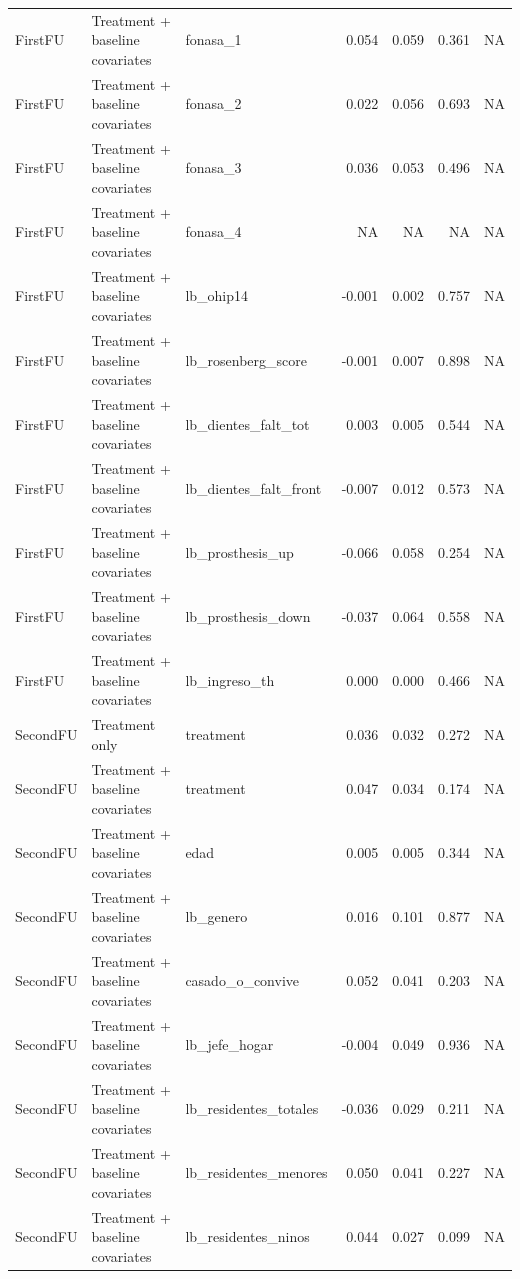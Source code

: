 \begin{table}
\begin{tabular}[t]{lllrrrr}
FirstFU & Treatment + baseline covariates & fonasa\_1 & 0.054 & 0.059 & 0.361 & NA\\
FirstFU & Treatment + baseline covariates & fonasa\_2 & 0.022 & 0.056 & 0.693 & NA\\
\addlinespace
FirstFU & Treatment + baseline covariates & fonasa\_3 & 0.036 & 0.053 & 0.496 & NA\\
FirstFU & Treatment + baseline covariates & fonasa\_4 & NA & NA & NA & NA\\
FirstFU & Treatment + baseline covariates & lb\_ohip14 & -0.001 & 0.002 & 0.757 & NA\\
FirstFU & Treatment + baseline covariates & lb\_rosenberg\_score & -0.001 & 0.007 & 0.898 & NA\\
FirstFU & Treatment + baseline covariates & lb\_dientes\_falt\_tot & 0.003 & 0.005 & 0.544 & NA\\
\addlinespace
FirstFU & Treatment + baseline covariates & lb\_dientes\_falt\_front & -0.007 & 0.012 & 0.573 & NA\\
FirstFU & Treatment + baseline covariates & lb\_prosthesis\_up & -0.066 & 0.058 & 0.254 & NA\\
FirstFU & Treatment + baseline covariates & lb\_prosthesis\_down & -0.037 & 0.064 & 0.558 & NA\\
FirstFU & Treatment + baseline covariates & lb\_ingreso\_th & 0.000 & 0.000 & 0.466 & NA\\
SecondFU & Treatment only & treatment & 0.036 & 0.032 & 0.272 & NA\\
\addlinespace
SecondFU & Treatment + baseline covariates & treatment & 0.047 & 0.034 & 0.174 & NA\\
SecondFU & Treatment + baseline covariates & edad & 0.005 & 0.005 & 0.344 & NA\\
SecondFU & Treatment + baseline covariates & lb\_genero & 0.016 & 0.101 & 0.877 & NA\\
SecondFU & Treatment + baseline covariates & casado\_o\_convive & 0.052 & 0.041 & 0.203 & NA\\
SecondFU & Treatment + baseline covariates & lb\_jefe\_hogar & -0.004 & 0.049 & 0.936 & NA\\
\addlinespace
SecondFU & Treatment + baseline covariates & lb\_residentes\_totales & -0.036 & 0.029 & 0.211 & NA\\
SecondFU & Treatment + baseline covariates & lb\_residentes\_menores & 0.050 & 0.041 & 0.227 & NA\\
SecondFU & Treatment + baseline covariates & lb\_residentes\_ninos & 0.044 & 0.027 & 0.099 & NA\\

\end{tabular}
\end{table}
